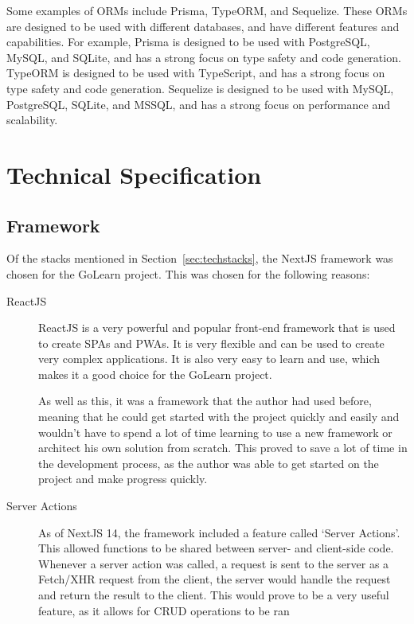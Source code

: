 \documentclass[12pt, a4paper,twoside]{report}
\theoremstyle{plain} %
\theoremstyle{definition} %
\numberwithin{equation}{chapter}
\begin{document}
Some examples of ORMs include Prisma, TypeORM, and Sequelize. These ORMs are
designed to be used with different databases, and have different features and
capabilities. For example, Prisma is designed to be used with PostgreSQL, MySQL,
and SQLite, and has a strong focus on type safety and code generation. TypeORM
is designed to be used with TypeScript, and has a strong focus on type safety
and code generation. Sequelize is designed to be used with MySQL, PostgreSQL,
SQLite, and MSSQL, and has a strong focus on performance and scalability.\cite{orms}


\chapter{Technical Specification}\label{ch:techspec}

\section{Framework}\label{sec:framework}

Of the stacks mentioned in Section~\ref{sec:techstacks}, the NextJS framework
was chosen for the GoLearn project. This was chosen for the following reasons:

\begin{description}
    \item[ReactJS\cite{what-is-react}] {
        ReactJS is a very powerful and popular front-end framework that is
        used to create SPAs and PWAs. It is very flexible and can be used to
        create very complex applications. It is also very easy to learn and
        use, which makes it a good choice for the GoLearn project.

        As well as this, it was a framework that the author had used before,
        meaning that he could get started with the project quickly and easily
        and wouldn't have to spend a lot of time learning to use a new framework
        or architect his own solution from scratch. This proved to save a lot
        of time in the development process, as the author was able to get started
        on the project and make progress quickly.
        }
    \item[Server Actions\cite{next-server-action}] {
        As of NextJS 14, the framework included a feature called `Server Actions'.
        This allowed functions to be shared between server- and client-side code.
        Whenever a server action was called, a request is sent to the server as a
        Fetch/XHR request from the client, the server would handle the request and
        return the result to the client. This would prove to be a very useful feature,
        as it allows for CRUD operations to be ran
        }
\end{description}
\end{document}
